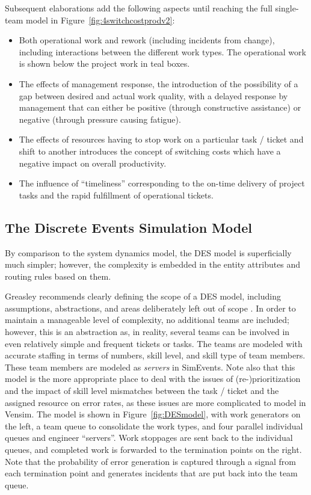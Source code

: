 \documentclass[conference]{IEEEtran}
\begin{document}
Subsequent elaborations add the following aspects until reaching the full single-team model in Figure~\ref{fig:4switchcostprodv2}:
\begin{itemize}
\item Both operational work and rework (including incidents from change), including interactions between the different work types. The operational work is shown below the project work in teal boxes.
\item The effects of management response, the introduction of the possibility of a gap between desired and actual work quality, with a delayed response by management that can either be positive (through constructive assistance) or negative (through pressure causing fatigue).
\item The effects of resources having to stop work on a particular task / ticket and shift to another introduces the concept of switching costs which have a negative impact on overall productivity. 
\item The influence of ``timeliness'' corresponding to the on-time delivery of project tasks and the rapid fulfillment of operational tickets.
\end{itemize}

\subsection{The Discrete Events Simulation Model}

By comparison to the system dynamics model, the DES model is superficially much simpler; however, the complexity is embedded in the entity attributes and routing rules based on them.

Greasley recommends clearly defining the scope of a DES model, including assumptions, abstractions, and areas deliberately left out of scope \cite{greasley_simulating_2019}. In order to maintain a manageable level of complexity, no additional teams are included; however, this is an abstraction as, in reality, several teams can be involved in even relatively simple and frequent tickets or tasks. The teams are modeled with accurate staffing in terms of numbers, skill level, and skill type of team members. These team members are modeled as \textit{servers} in SimEvents. Note also that this model is the more appropriate place to deal with the issues of (re-)prioritization and the impact of skill level mismatches between the task / ticket and the assigned resource on error rates, as these issues are more complicated to model in Vensim. The model is shown in Figure~\ref{fig:DESmodel}, with work generators on the left, a team queue to consolidate the work types, and four parallel individual queues and engineer ``servers''. Work stoppages are sent back to the individual queues, and completed work is forwarded to the termination points on the right. Note that the probability of error generation is captured through a signal from each termination point and generates incidents that are put back into the team queue.
\end{document}
